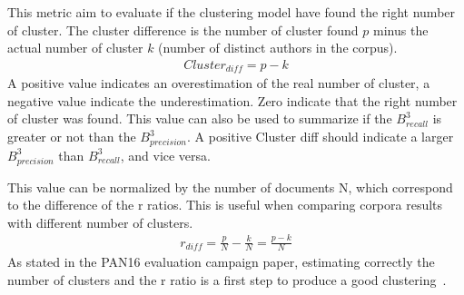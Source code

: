 \begin{definition}
  This metric aim to evaluate if the clustering model have found the right number of cluster.
  The cluster difference is the number of cluster found $p$ minus the actual number of cluster $k$ (number of distinct authors in the corpus).
  \begin{gather*}
    Cluster_{diff} = p - k
  \end{gather*}
  A positive value indicates an overestimation of the real number of cluster, a negative value indicate the underestimation.
  Zero indicate that the right number of cluster was found.
  This value can also be used to summarize if the $B^3_{recall}$ is greater or not than the $B^3_{precision}$.
  A positive Cluster diff should indicate a larger $B^3_{precision}$ than $B^3_{recall}$, and vice versa.

  This value can be normalized by the number of documents N, which correspond to the difference of the r ratios.
  This is useful when comparing corpora results with different number of clusters.
  \begin{gather*}
    r_{diff} = \frac{p}{N} - \frac{k}{N} = \frac{p - k}{N}
  \end{gather*}
  As stated in the PAN16 evaluation campaign paper, estimating correctly the number of clusters and the r ratio is a first step to produce a good clustering~\cite{pan16}.
\end{definition}
